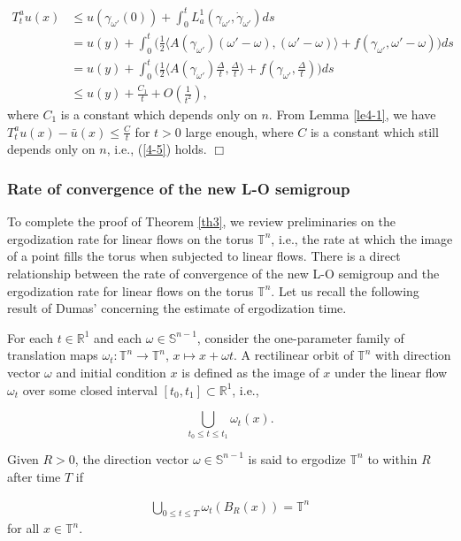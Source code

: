 \documentclass{amsart}[12pt]
\theoremstyle{definition}
\theoremstyle{remark}
\numberwithin{equation}{section}
\begin{document}
\begin{align*}
T^a_tu(x) & \leq
          u(\gamma_{\omega'}(0))+\int_0^tL^1_a(\gamma_{\omega'},\dot{\gamma}_{\omega'})ds\\
        & = u(y)+\int_0^t\Big(\frac{1}{2}\langle
        A(\gamma_{\omega'})(\omega'-\omega),(\omega'-\omega)\rangle+f(\gamma_{\omega'},\omega'-\omega)\Big)ds\\
        & = u(y)+\int_0^t\Big(\frac{1}{2}\Big\langle
        A(\gamma_{\omega'})\frac{\Delta}{t},\frac{\Delta}{t}\Big\rangle+f(\gamma_{\omega'},\frac{\Delta}{t})\Big)ds\\
        & \leq u(y)+\frac{C_1}{t}+O(\frac{1}{t^2}),
\end{align*}
where $C_1$ is a constant which depends only on $n$. From Lemma
\ref{le4-1}, we have $T^a_tu(x)-\bar{u}(x)\leq\frac{C}{t}$ for
$t>0$ large enough, where $C$ is a constant which still depends
only on $n$, i.e., (\ref{4-5}) holds. \hfill $\Box$

\subsubsection{Rate of convergence of the new L-O semigroup}
To complete the proof of Theorem \ref{th3}, we review
preliminaries on the ergodization rate for linear flows on the
torus $\mathbb{T}^n$, i.e., the rate at which the image of a point
fills the torus when subjected to linear flows. There is a direct
relationship between the rate of convergence of the new L-O
semigroup and the ergodization rate for linear flows on the torus
$\mathbb{T}^n$. Let us recall the following result of Dumas'
\cite{Dum} concerning the estimate of ergodization time.

For each $t\in\mathbb{R}^1$ and each $\omega\in\mathbb{S}^{n-1}$,
consider the one-parameter family of translation maps
$\omega_t:\mathbb{T}^n\rightarrow\mathbb{T}^n$, $x\mapsto x+\omega
t$. A rectilinear orbit of $\mathbb{T}^n$ with direction vector
$\omega$ and initial condition $x$ is defined as the image of $x$
under the linear flow $\omega_t$ over some closed interval
$[t_0,t_1]\subset\mathbb{R}^1$, i.e.,

\[
\bigcup_{t_0\leq t\leq t_1}\omega_t(x).
\]

Given $R>0$, the direction vector $\omega\in\mathbb{S}^{n-1}$ is
said to ergodize $\mathbb{T}^n$ to within $R$ after time $T$ if

\begin{align}\label{4-6}
\bigcup_{0\leq t\leq T}\omega_t(B_R(x))=\mathbb{T}^n
\end{align}
for all $x\in\mathbb{T}^n$.
\end{document}
